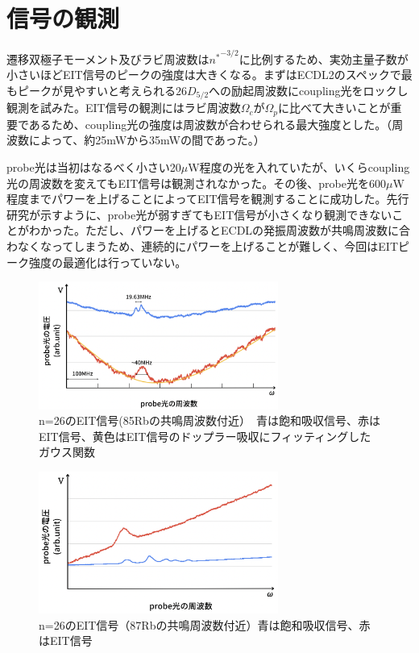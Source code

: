 \documentclass[dvipdfmx]{jsreport}
\begin{document}
\section{信号の観測}
遷移双極子モーメント及びラビ周波数は${n^*}^{-3/2}$に比例するため\cite{yuma}、実効主量子数が小さいほどEIT信号のピークの強度は大きくなる。まずはECDL2のスペックで最もピークが見やすいと考えられる$26D_{5/2}$への励起周波数にcoupling光をロックし観測を試みた。EIT信号の観測にはラビ周波数$\Omega_c$が$\Omega_p$に比べて大きいことが重要であるため、coupling光の強度は周波数が合わせられる最大強度とした。（周波数によって、約25mWから35mWの間であった。）

probe光は当初はなるべく小さい20$\mu$W程度の光を入れていたが、いくらcoupling光の周波数を変えてもEIT信号は観測されなかった。その後、probe光を600$\mu$W程度までパワーを上げることによってEIT信号を観測することに成功した。先行研究\cite{optimize}が示すように、probe光が弱すぎてもEIT信号が小さくなり観測できないことがわかった。ただし、パワーを上げるとECDLの発振周波数が共鳴周波数に合わなくなってしまうため、連続的にパワーを上げることが難しく、今回はEITピーク強度の最適化は行っていない。

\begin{figure}[hbtp]
\centering
\includegraphics[width=0.7\textwidth]{images/eit26.png}
\caption{\label{fig:eit26}n=26のEIT信号(85Rbの共鳴周波数付近）　青は飽和吸収信号、赤はEIT信号、黄色はEIT信号のドップラー吸収にフィッティングしたガウス関数}
\end{figure}
\begin{figure}[hbtp]
\centering
\includegraphics[width=0.7\textwidth]{images/eit87.png}
\caption{\label{fig:eit87}n=26のEIT信号（87Rbの共鳴周波数付近）青は飽和吸収信号、赤はEIT信号}
\end{figure}
\end{document}
